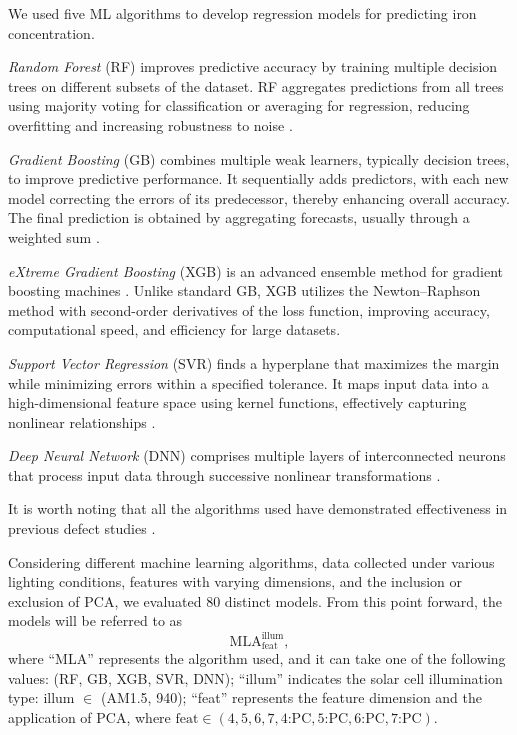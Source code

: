 \documentclass[a4paper,fleqn]{cas-sc}
\begin{document}
We used five ML algorithms to develop regression models for predicting iron concentration.

\emph{Random Forest} (RF) improves predictive accuracy by training multiple decision trees on different subsets of the dataset.
RF aggregates predictions from all trees using majority voting for classification or averaging for regression, 
reducing overfitting and increasing robustness to noise \cite{Breiman2001}.

\emph{Gradient Boosting} (GB) combines multiple weak learners, typically decision trees, to improve predictive performance.
It sequentially adds predictors, with each new model correcting the errors of its predecessor, thereby enhancing overall accuracy.
The final prediction is obtained by aggregating forecasts, usually through a weighted sum \cite{Natekin2013}.

\emph{eXtreme Gradient Boosting} (XGB) is an advanced ensemble method for gradient boosting machines \cite{Akinpelu2024}.
Unlike standard GB, XGB utilizes the Newton–Raphson method with second-order derivatives of the loss function, 
improving accuracy, computational speed, and efficiency for large datasets.

\emph{Support Vector Regression }(SVR) finds a hyperplane that maximizes the margin while minimizing errors within a specified tolerance.
It maps input data into a high-dimensional feature space using kernel functions, effectively capturing nonlinear relationships \cite{Cao2020}.

\emph{Deep Neural Network} (DNN) comprises multiple layers of interconnected neurons that process input data 
through successive nonlinear transformations \cite{Liu2023}.

It is worth noting that all the algorithms used have demonstrated effectiveness in previous 
defect studies \cite{Buratti2020a, Buratti2022, Olikh2022PPV, Buratti2024}.

Considering different machine learning algorithms, data collected under various lighting conditions, 
features with varying dimensions, and the inclusion or exclusion of PCA, we evaluated 80 distinct models. 
From this point forward, the models will be referred to as
\begin{equation*}
    \mathrm{MLA}^\mathrm{illum}_\mathrm{feat},
\end{equation*}
where ``MLA'' represents the algorithm used, 
and it can take one of the following values: (RF, GB, XGB, SVR, DNN);
``illum'' indicates the solar cell illumination type: illum $\in$ (AM1.5, 940);
``feat'' represents the feature dimension and the application of PCA, 
where $\mathrm{feat} \in (4, 5, 6, 7, 4\text{:PC}, 5\text{:PC}, 6\text{:PC}, 7\text{:PC})$.
\end{document}
